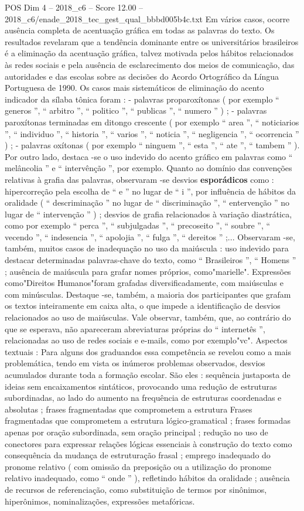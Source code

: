 \begin{textsample}{POS Dim 4 – 2018\_c6 – Score 12.00 – 2018\_c6/enade\_2018\_tec\_gest\_qual\_bbbd005b4c.txt}
Em vários casos, ocorre ausência completa de acentuação gráfica em todas as palavras do texto.
Os resultados revelaram que a tendência dominante entre os universitários brasileiros é a eliminação da acentuação gráfica, talvez motivada pelos hábitos relacionados às redes sociais e pela ausência de esclarecimento dos meios de comunicação, das autoridades e das escolas sobre as decisões do Acordo Ortográfico da Língua Portuguesa de 1990.
Os casos mais sistemáticos de eliminação do acento indicador da sílaba tônica foram : - palavras proparoxítonas ( por exemplo “ generos ”, “ arbitro ”, “ politico ”, “ publicas ”, “ numero ” ) ; - palavras paroxítonas terminadas em ditongo crescente ( por exemplo “ area ”, “ noticiarios ”, “ individuo ”, “ historia ”, “ varios ”, “ noticia ”, “ negligencia ”, “ ocorrencia ” ) ; - palavras oxítonas ( por exemplo “ ninguem ”, “ esta ”, “ ate ”, “ tambem ” ).
Por outro lado, destaca -se o uso indevido do acento gráfico em palavras como “ melâncolia ” e “ intervênção ”, por exemplo.
Quanto ao domínio das convenções relativas à grafia das palavras, observaram -se desvios \textbf{esporádicos} como : hipercorreção pela escolha de “ e ” no lugar de “ i ”, por influência de hábitos da oralidade ( “ descriminação ” no lugar de “ discriminação ”, “ entervenção ” no lugar de “ intervenção ” ) ; desvios de grafia relacionados à variação diastrática, como por exemplo “ perca ”, “ subjulgadas ”, “ precoseito ”, “ soubre ”, “ vecendo ”, “ indesencia ”, “ apolojia ”, “ fulga ”, “ dereitos ” ;...
Observaram -se, também, muitos casos de inadequação no uso da maiúscula : uso indevido para destacar determinadas palavras-chave do texto, como “ Brasileiros ”, “ Homens ” ; ausência de maiúscula para grafar nomes próprios, como"marielle".
Expressões como"Direitos Humanos"foram grafadas diversificadamente, com maiúsculas e com minúsculas.
Destaque -se, também, a maioria dos participantes que grafam os textos inteiramente em caixa alta, o que impede a identificação de desvios relacionados ao uso de maiúsculas.
Vale observar, também, que, ao contrário do que se esperava, não apareceram abreviaturas próprias do “ internetês ”, relacionadas ao uso de redes sociais e e-mails, como por exemplo"vc".
Aspectos textuais : Para alguns dos graduandos essa competência se revelou como a mais problemática, tendo em vista os inúmeros problemas observados, desvios acumulados durante toda a formação escolar.
São eles : sequência justaposta de ideias sem encaixamentos sintáticos, provocando uma redução de estruturas subordinadas, ao lado do aumento na frequência de estruturas coordenadas e absolutas ; frases fragmentadas que comprometem a estrutura Frases fragmentadas que comprometem a estrutura lógico-gramatical ; frases formadas apenas por oração subordinada, sem oração principal ; redução no uso de conectores para expressar relações lógicas essenciais à construção do texto como consequência da mudança de estruturação frasal ; emprego inadequado do pronome relativo ( com omissão da preposição ou a utilização do pronome relativo inadequado, como “ onde ” ), refletindo hábitos da oralidade ; ausência de recursos de referenciação, como substituição de termos por sinônimos, hiperônimos, nominalizações, expressões metafóricas.

\end{textsample}
